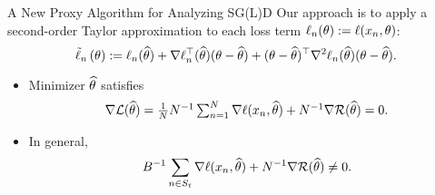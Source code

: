 \documentclass[10pt,xcolor=table]{beamer}
\begin{document}
\begin{frame}{A New Proxy Algorithm for Analyzing SG(L)D}
Our approach is to apply a second-order Taylor approximation to each loss term $\ell_{n}(\theta) := \ell(x_{n}, \theta)$:
\begin{equation*}
	\tilde\ell_{n}\left(\theta\right)  := \ell_{n}(\widehat{\theta}) + \nabla \ell_{n}^{\top}( \widehat{\theta}) (\theta-\widehat{\theta})+ (\theta-\widehat{\theta})^{\top}\nabla^{2} \ell_{n}(\widehat{\theta}) (\theta-\widehat{\theta}).
	\label{eq: proxy algorithm framework for general loss}
\end{equation*}\pause

\begin{itemize}
	\item Minimizer $\widehat{\theta}$ satisfies 
	$$
	\nabla\textstyle\mathcal{L}(\widehat{\theta}) = \frac{1}{N} N^{-1} \sum_{n =1}^{N} \nabla \ell(x_{n}, \widehat{\theta}) + N^{-1} \nabla \mathcal{R}(\widehat{\theta}) = 0.
	$$
	\item In general, 
	$$
	B^{-1} \sum_{n \in S_{t}} \nabla \ell(x_{n}, \widehat{\theta}) + N^{-1} \nabla \mathcal{R}(\widehat{\theta}) \neq 0.
	$$
\end{itemize}
\end{frame}
\end{document}
